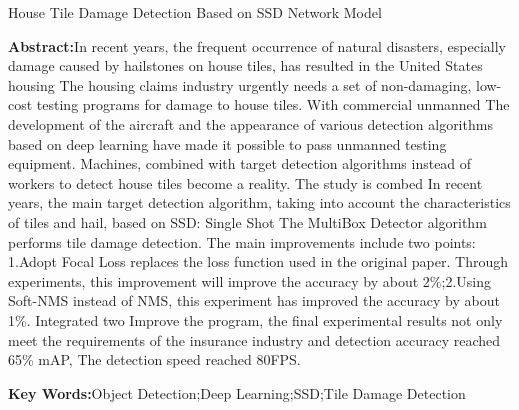\rule{0pt}{0pt} 
\begin{center}
	\heiti {} House Tile Damage Detection Based on SSD Network Model
\end{center}
\rule{0pt}{0pt} 
\par \noindent
\textbf{\songti {}Abstract:}In recent years, the frequent occurrence of natural disasters, especially damage caused by hailstones on house tiles, has resulted in the United States housing
The housing claims industry urgently needs a set of non-damaging, low-cost testing programs for damage to house tiles. With commercial unmanned
The development of the aircraft and the appearance of various detection algorithms based on deep learning have made it possible to pass unmanned testing equipment.
Machines, combined with target detection algorithms instead of workers to detect house tiles become a reality. The study is combed
In recent years, the main target detection algorithm, taking into account the characteristics of tiles and hail, based on SSD: Single Shot
The MultiBox Detector algorithm performs tile damage detection. The main improvements include two points: 1.Adopt Focal
Loss replaces the loss function used in the original paper. Through experiments, this improvement will improve the accuracy by about 2\%;2.Using Soft-NMS instead of NMS, this experiment has improved the accuracy by about 1\%. Integrated two
Improve the program, the final experimental results not only meet the requirements of the insurance industry and detection accuracy reached 65\% mAP,
The detection speed reached 80FPS.~\\

\par \noindent
\textbf{\songti {}Key Words:}{\kaishu {}Object Detection;Deep Learning;SSD;Tile Damage Detection}
